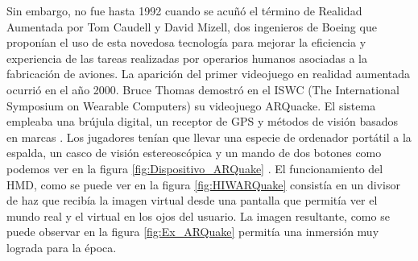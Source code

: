 Sin embargo, no fue hasta 1992 cuando se acuñó el término de Realidad Aumentada por Tom Caudell y David Mizell, dos ingenieros de Boeing que proponían el uso de esta novedosa tecnología para mejorar la eficiencia y experiencia de las tareas realizadas por operarios humanos asociadas a la fabricación de aviones.
La aparición del primer videojuego en realidad aumentada ocurrió en el año 2000. Bruce Thomas demostró en el ISWC (The International Symposium on Wearable Computers) su videojuego ARQuacke. El sistema empleaba una brújula digital, un receptor de GPS y métodos de visión basados en marcas \cite{ARToolkit}. Los jugadores tenían que llevar una especie de ordenador portátil a la espalda, un casco de visión estereoscópica y un mando de dos botones \cite{ARQuake} como podemos ver en la figura \ref{fig:Dispositivo_ARQuake} . El funcionamiento del HMD, como se puede ver en la figura \ref{fig:HIWARQuake} consistía en un divisor de haz que recibía la imagen virtual desde una pantalla que permitía ver el mundo real y el virtual en los ojos del usuario. La imagen resultante, como se puede observar en la figura \ref{fig:Ex_ARQuake} permitía una inmersión muy lograda para la época.


